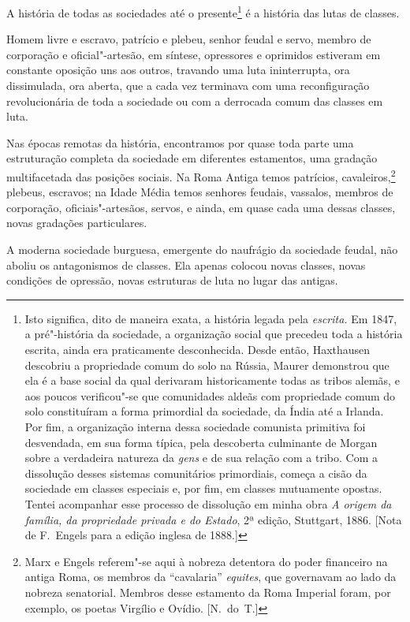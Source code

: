 A história de todas as sociedades até o
presente\footnote{ Isto significa, dito de maneira exata, a história legada
pela \textit{escrita.} Em 1847, a pré"-história da sociedade, a organização
social que precedeu toda a história escrita, ainda era praticamente
desconhecida. Desde então, Haxthausen descobriu a propriedade comum do
solo na Rússia, Maurer demonstrou que ela é a base social da qual
derivaram historicamente todas as tribos alemãs, e aos poucos
verificou"-se que comunidades aldeãs com propriedade comum do solo
constituíram a forma primordial da sociedade, da Índia até a Irlanda.
Por fim, a organização interna dessa sociedade comunista primitiva foi
desvendada, em sua forma típica, pela descoberta culminante de Morgan
sobre a verdadeira natureza da \textit{gens} e de sua relação com a
tribo. Com a dissolução desses sistemas comunitários primordiais,
começa a cisão da sociedade em classes especiais e, por fim, em classes
mutuamente opostas. Tentei acompanhar esse processo de dissolução em
minha obra \textit{A origem da família, da propriedade privada e do
Estado}, 2ª edição, Stuttgart, 1886. [Nota de F.~Engels para a edição
inglesa de 1888.]}
é a história das lutas de classes.

Homem livre e escravo, patrício e plebeu, senhor feudal e servo, membro
de corporação e oficial"-artesão, em síntese, opressores e oprimidos
estiveram em constante oposição uns aos outros, travando uma luta
ininterrupta, ora dissimulada, ora aberta, que a cada vez terminava com
uma reconfiguração revolucionária de toda a sociedade ou com a
derrocada comum das classes em luta.

Nas épocas remotas da história, encontramos por quase toda parte
uma estruturação completa da sociedade em diferentes estamentos, uma
gradação multifacetada das posições sociais. Na Roma Antiga temos
patrícios, cavaleiros,\footnote{ Marx e Engels referem"-se aqui à nobreza	
detentora do poder financeiro na antiga Roma, os membros da
“cavalaria” \textit{equites}, que governavam ao lado da nobreza
senatorial. Membros desse estamento da Roma Imperial foram, por
exemplo, os poetas Virgílio e Ovídio. [N.~do~T.]} plebeus, escravos; na 
Idade Média temos senhores feudais, vassalos, membros de corporação, oficiais"-artesãos, 
servos, e ainda, em quase cada uma dessas classes, novas gradações particulares.

A moderna sociedade burguesa, emergente do naufrágio da sociedade
feudal, não aboliu os antagonismos de classes. Ela apenas colocou novas
classes, novas condições de opressão, novas estruturas de luta no lugar
das antigas.

